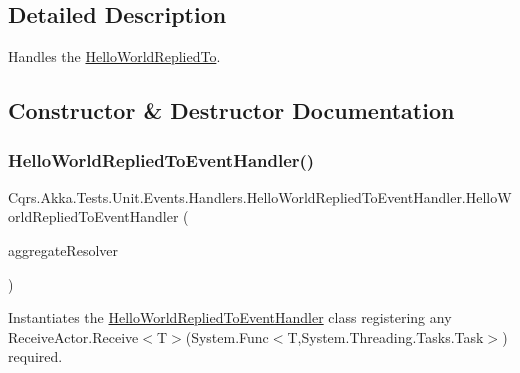 \subsection{Detailed Description}
Handles the \hyperlink{classCqrs_1_1Akka_1_1Tests_1_1Unit_1_1Events_1_1HelloWorldRepliedTo}{Hello\+World\+Replied\+To}. 



\subsection{Constructor \& Destructor Documentation}
\mbox{\label{classCqrs_1_1Akka_1_1Tests_1_1Unit_1_1Events_1_1Handlers_1_1HelloWorldRepliedToEventHandler_aa566f26a38bc21ed270a1854de47408d_aa566f26a38bc21ed270a1854de47408d}} 
\subsubsection{\texorpdfstring{Hello\+World\+Replied\+To\+Event\+Handler()}{HelloWorldRepliedToEventHandler()}}
{\footnotesize\ttfamily Cqrs.\+Akka.\+Tests.\+Unit.\+Events.\+Handlers.\+Hello\+World\+Replied\+To\+Event\+Handler.\+Hello\+World\+Replied\+To\+Event\+Handler (\begin{DoxyParamCaption}\item[{\hyperlink{interfaceCqrs_1_1Akka_1_1Domain_1_1IAkkaAggregateResolver}{I\+Akka\+Aggregate\+Resolver}}]{aggregate\+Resolver }\end{DoxyParamCaption})}



Instantiates the \hyperlink{classCqrs_1_1Akka_1_1Tests_1_1Unit_1_1Events_1_1Handlers_1_1HelloWorldRepliedToEventHandler}{Hello\+World\+Replied\+To\+Event\+Handler} class registering any Receive\+Actor.\+Receive$<$\+T$>$(\+System.\+Func$<$\+T,\+System.\+Threading.\+Tasks.\+Task$>$) required. 



